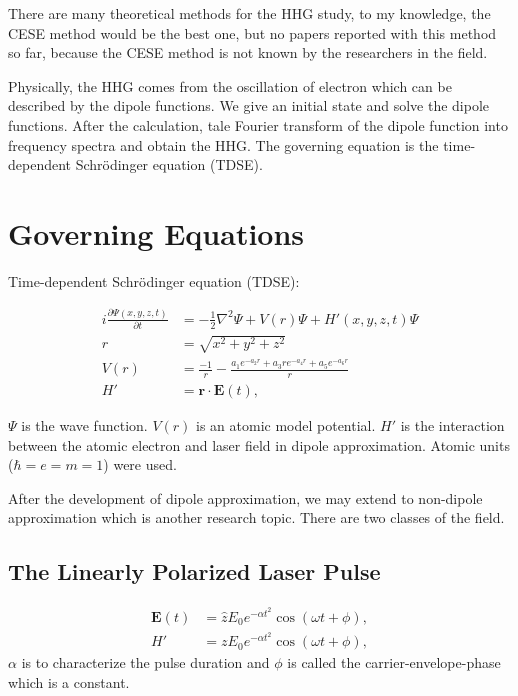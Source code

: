 \documentclass{isildur}
\begin{document}
There are many theoretical methods for the HHG study, to my knowledge, the CESE
method would be the best one, but no papers reported with this method so far,
because the CESE method is not known by the researchers in the field.

Physically, the HHG comes from the oscillation of electron which can be
described by the dipole functions. We give an initial state and solve the
dipole functions.  After the calculation, tale Fourier transform of the dipole
function into frequency spectra and obtain the HHG.  The governing equation is
the time-dependent Schrödinger equation (TDSE).

\chapter{Governing Equations}
\label{c:goveq}

Time-dependent Schrödinger equation (TDSE):

\begin{align}
  i\frac{\partial \Psi(x, y, z, t)}{\partial t}
    &= -\frac{1}{2}\nabla^2\Psi + V(r)\Psi + H'(x, y, z, t)\Psi
    \label{e:tdse} \\
  r &= \sqrt{x^2+y^2+z^2} \nonumber \\
  V(r) &= \frac{-1}{r}
        - \frac{a_1e^{-a_2r}+a_3re^{-a_4r}+a_5e^{-a_6r}}{r} \\
  H' &= \mathbf{r}\cdot \mathbf{E}(t),
\end{align}

$\Psi$ is the wave function.  $V(r)$ is an atomic model potential.  $H'$ is the
interaction between the atomic electron and laser field in dipole
approximation.  Atomic units ($\hbar = e = m = 1$) were used.

After the development of dipole approximation, we may extend to non-dipole
approximation which is another research topic.  There are two classes of the
field.

\section{The Linearly Polarized Laser Pulse}

\begin{align}
  \mathbf{E}(t) &= {\hat z}E_0e^{-\alpha t^2}\cos(\omega t+\phi), \\
  H' &= zE_0e^{-\alpha t^2}\cos(\omega t+\phi),
\end{align}
%
$\alpha$ is to characterize the pulse duration and $\phi$ is called the
carrier-envelope-phase which is a constant.
\end{document}
